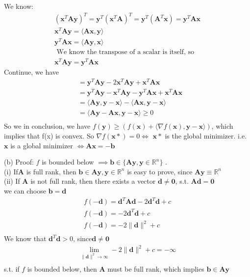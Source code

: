 \documentclass[a4paper,12pt]{article}
\newcommand{\R}{\mathbb{R}}
\begin{document}
We know:
\begin{align*}
    (\bm{x}^T\bm{A}\bm{y})^T = \bm{y}^T(\bm{x}^T\bm{A})^T = \bm{y}^T(\bm{A}^T\bm{x}) = \bm{y}^T\bm{A}\bm{x} \\
    \bm{x}^T\bm{A}\bm{y} = \langle \bm{A}\bm{x}, \bm{y}\rangle \\
    \bm{y}^T\bm{A}\bm{x} = \langle \bm{A}\bm{y}, \bm{x}\rangle \\
    \text{ We know the transpose of a scalar is itself, so} \\
    \bm{x}^T\bm{A}\bm{y} = \bm{y}^T\bm{A}\bm{x}
\end{align*}
Continue, we have
\begin{align*}
    &= \bm{y}^T\bm{A}\bm{y} - 2\bm{x}^T\bm{A}\bm{y} + \bm{x}^T\bm{A}\bm{x}  \\
    &= \bm{y}^T\bm{A}\bm{y} - \bm{x}^T\bm{A}\bm{y} - \bm{y}^T\bm{A}\bm{x} + \bm{x}^T\bm{A}\bm{x} \\
    &= \langle \bm{A}\bm{y}, \bm{y} - \bm{x}\rangle - \langle \bm{A}\bm{x}, \bm{y} - \bm{x} \rangle \\
    &= \langle \bm{A}\bm{y} - \bm{A}\bm{x}, \bm{y} - \bm{x} \rangle \geq 0 \\
\end{align*}
So we in conclusion, we have \(f(\bm{y}) \geq (f(\bm{x} )+ \langle \nabla f(\bm{x}), \bm{y} - \bm{x}\rangle)\), which implies that f(x) is convex.
So \(\nabla f(\bm{x}*) = 0 \iff\) \(\bm{x}*\) is the global minimizer. i.e. \\
\(\bm{x}\) is a global minimizer \( \iff \bm{A}\bm{x} = -\bm{b}\)

(b) 
Proof: \(f\) is bounded below \(\implies \bm{b} \in \{\bm{A}\bm{y}, \bm{y} \in \R^n\}\) .   \\
(i) If\(\bm{A}\) is full rank, then \(\bm{b} \in \bm{A}\bm{y}, \bm{y} \in \R^n\) is easy to prove, since \(\bm{A}\bm{y} \equiv \R^n\) \\
(ii) If \(\bm{A}\) is not full rank, then there exists a vector \(\bm{d} \ne \bm{0}\), s.t. \(\bm{A}\bm{d} = \bm{0}\) \\
we can choose \( \bm{b} = \bm{d}\) \\
\begin{align*}
    f(-\bm{d}) = \bm{d}^T\bm{A}\bm{d} - 2\bm{d}^T\bm{d} + c \\
    f(-\bm{d}) = -2\bm{d}^T\bm{d} + c \\
    f(-\bm{d}) = -2\|\bm{d}\|^2 + c \\
\end{align*}
We know that \(\bm{d}^T\bm{d} > 0\), since\( \bm{d} \ne \bm{0}\) \\
\begin{align*}
    \lim_{\|\bm{d}\|^2 \to \infty} -2\|\bm{d}\|^2 + c = -\infty \\
\end{align*}
s.t. if \(f\) is bounded below, then \(\bm{A}\) must be full rank, which implies \(\bm{b} \in \bm{A}\bm{y}\) \\
\end{document}

